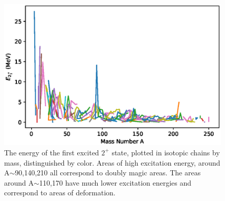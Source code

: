 \begin{figure}[!tbp]
    \centering
    \includegraphics[scale=0.9]{Introduction_Figs/E2vsA.eps}
    \caption{The energy of the first excited $2^+$ state, plotted in isotopic chains by mass, distinguished by color. Areas of high excitation energy, around A$\sim$90,140,210 all correspond to doubly magic areas. The areas around A$\sim$110,170 have much lower excitation energies and correspond to areas of deformation. }
    \label{fig:E2bymass}
\end{figure}